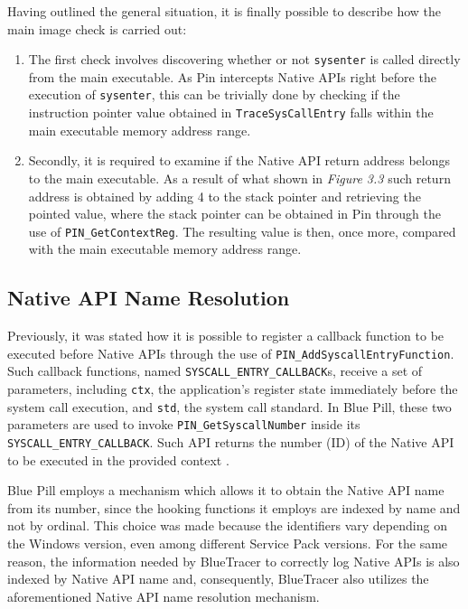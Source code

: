 Having outlined the general situation, it is finally possible to describe how the main image check is carried out:

\begin{enumerate}
\item The first check involves discovering whether or not \texttt{sysenter} is called directly from the main executable. As Pin intercepts Native APIs right before the execution of \texttt{sysenter}, this can be trivially done by checking if the instruction pointer value obtained in \texttt{TraceSysCallEntry} falls within the main executable memory address range.
\item Secondly, it is required to examine if the Native API return address belongs to the main executable. As a result of what shown in \textit{Figure 3.3} such return address is obtained by adding 4 to the stack pointer and retrieving the pointed value, where the stack pointer can be obtained in Pin through the use of \texttt{PIN\_GetContextReg}. The resulting value is then, once more, compared with the main executable memory address range.
\end{enumerate}

\subsection{Native API Name Resolution}

Previously, it was stated how it is possible to register a callback function to be executed before Native APIs through the use of \texttt{PIN\_AddSyscallEntryFunction}. Such callback functions, named \texttt{SYSCALL\_ENTRY\_CALLBACK}s, receive a set of parameters, including \texttt{ctx}, the application's register state immediately before the system call execution, and \texttt{std}, the system call standard. In Blue Pill, these two parameters are used to invoke \texttt{PIN\_GetSyscallNumber} inside its \texttt{SYSCALL\_ENTRY\_CALLBACK}. Such API returns the number (ID) of the Native API to be executed in the provided context \cite{Pin}.

Blue Pill employs a mechanism which allows it to obtain the Native API name from its number, since the hooking functions it employs are indexed by name and not by ordinal. This choice was made because the identifiers vary depending on the Windows version, even among different Service Pack versions. For the same reason, the information needed by BlueTracer to correctly log Native APIs is also indexed by Native API name and, consequently, BlueTracer also utilizes the aforementioned Native API name resolution mechanism.


